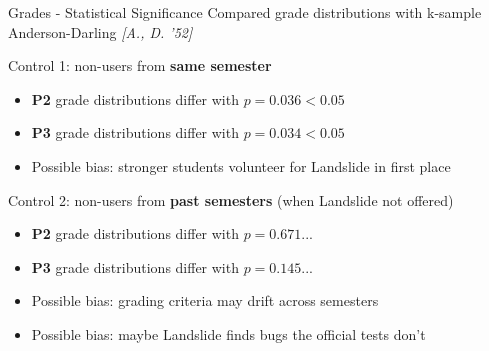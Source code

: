 \documentclass[xcolor=dvipsnames]{beamer}
\begin{document}
\begin{frame}{Grades - Statistical Significance}
	Compared %
	grade distributions with k-sample Anderson-Darling {\em [A., D. '52]}
	\linegap

	Control 1: non-users from {\bf same semester}
	\begin{itemize}
		\item {\bf P2} grade distributions differ with $p = 0.036 < 0.05$
		\item {\bf P3} grade distributions differ with $p = 0.034 < 0.05$
		\item Possible bias: stronger students volunteer for Landslide in first place
	\end{itemize}
	\linegap

	Control 2: non-users from {\bf past semesters} (when Landslide not offered)
	\begin{itemize}
		\item {\bf P2} grade distributions differ with $p = 0.671$...
		\item {\bf P3} grade distributions differ with $p = 0.145$...
		\item Possible bias: grading criteria may drift across semesters
		\item Possible bias: maybe Landslide finds bugs the official tests don't
	\end{itemize}
\end{frame}
\end{document}
